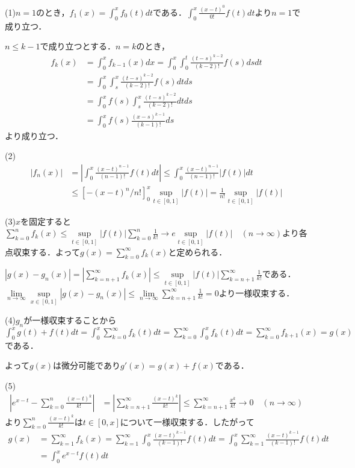 \documentclass[
		book,
		head_space=20mm,
		foot_space=20mm,
		gutter=10mm,
		line_length=190mm
]{jlreq}
\begin{document}
(1)$n=1$のとき，$f_1(x)=\int_0^x f_0(t)dt$である．$\int_0^x \frac{(x-t)^0}{0!}f(t)dt$より$n=1$で成り立つ．

$n\le k-1$で成り立つとする．$n=k$のとき，
\begin{align}
    f_{k}(x)&=\int_0^x f_{k-1}(x)dx=\int_0^x \int_0^t \frac{(t-s)^{k-2}}{(k-2)!}f(s)dsdt \\
    &= \int_0^x \int_s^x \frac{(t-s)^{k-2}}{(k-2)!}f(s)dtds \\
    &= \int_0^x f(s) \int_s^x \frac{(t-s)^{k-2}}{(k-2)!}dtds \\
    &= \int_0^x f(s) \frac{(x-s)^{k-1}}{(k-1)!}ds
\end{align}
より成り立つ．

(2)\begin{align}
|f_n(x)|&=\left| \int_0^x \frac{(x-t)^{n-1}}{(n-1)!}f(t)dt\right| \le \int_0^x \frac{(x-t)^{n-1}}{(n-1)!}|f(t)|dt \\
&\le [-(x-t)^n /n!]_0^x \sup\limits_{t\in [0,1]}|f(t)|=\frac{1}{n!}\sup\limits_{t\in [0,1]}|f(t)|
\end{align}

(3)$x$を固定すると$\sum_{k=0}^{n} f_k(x)\le \sup\limits_{t\in [0,1]}|f(t)|\sum_{k=0}^{n} \frac{1}{k!}\rightarrow e\sup\limits_{t\in [0,1]}|f(t)|\quad(n \to \infty)$より各点収束する．よって$g(x)=\sum_{k=0}^{\infty} f_k(x)$と定められる．

$|g(x)-g_n(x)|=\left| \sum_{k=n+1}^{\infty} f_k(x)\right| \le \sup\limits_{t\in [0,1]}|f(t)|\sum_{k=n+1}^{\infty} \frac{1}{k!}$である．
$\lim\limits_{n\to \infty} \sup\limits_{x \in [0,1]}|g(x)-g_n(x)|\le \lim\limits_{n\to \infty} \sum_{k=n+1}^{\infty} \frac{1}{k!}=0$より一様収束する．

(4)$g_n$が一様収束することから
$\int_0^x g(t)+f(t)dt=\int_0^x \sum_{k=0}^{\infty} f_k(t)dt=\sum_{k=0}^{\infty} \int_0^x f_k(t)dt=\sum_{k=0}^{\infty} f_{k+1}(x)=g(x)$である．

よって$g(x)$は微分可能であり$g'(x)=g(x)+f(x)$である．

(5)
\begin{align}
    \left|e^{x-t}-\sum_{k=0}^{n} \frac{(x-t)^k}{k!}\right|&=\left| \sum_{k=n+1}^{\infty} \frac{(x-t)^k}{k!}\right| \le \sum_{k=n+1}^{\infty} \frac{x^k}{k!} \rightarrow 0\quad (n\to \infty)
\end{align}より$\sum_{k=0}^{n} \frac{(x-t)^k}{k!}$は$t\in[0,x]$について一様収束する．したがって
\begin{align}
    g(x)&=\sum_{k=1}^{\infty} f_k(x)=\sum_{k=1}^{\infty} \int_0^x \frac{(x-t)^{k-1}}{(k-1)!}f(t)dt=\int_0^x \sum_{k=1}^{\infty} \frac{(x-t)^{k-1}}{(k-1)!}f(t)dt\\
    &=\int_0^x e^{x-t}f(t)dt
\end{align}

        
\end{document}
